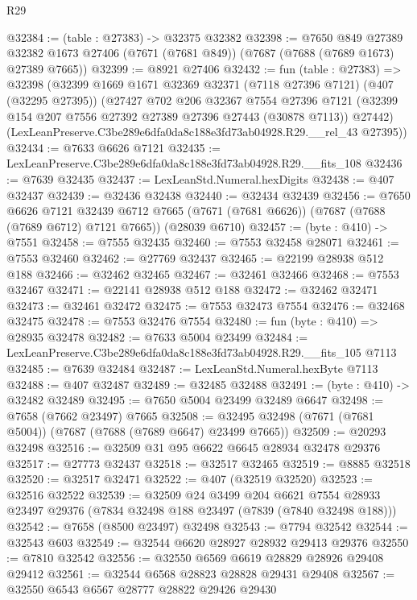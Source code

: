 \begin{lexlean}{R29}
\begin{coremodule}
@32384 := (table : @27383) -> @32375 @32382
@32398 := @7650
    @849
    @27389
    @32382
    @1673
    @27406
    (@7671 (@7681 @849))
    (@7687 (@7688 (@7689 @1673) @27389 @7665))
@32399 := @8921 @27406
@32432 := fun (table : @27383) =>
  @32398
    (@32399
      @1669
      @1671
      @32369
      @32371
      (@7118 @27396 @7121)
      (@407 (@32295 @27395))
      (@27427
        @702
        @206
        @32367
        @7554
        @27396
        @7121
        (@32399 @154 @207 @7556 @27392 @27389 @27396 @27443 (@30878 @7113))
        @27442)
      (LexLeanPreserve.C3be289e6dfa0da8c188e3fd73ab04928.R29.__rel_43 @27395))
@32434 := @7633 @6626 @7121
@32435 := LexLeanPreserve.C3be289e6dfa0da8c188e3fd73ab04928.R29.__fits_108
@32436 := @7639 @32435
@32437 := LexLeanStd.Numeral.hexDigits
@32438 := @407 @32437
@32439 := @32436 @32438
@32440 := @32434 @32439
@32456 := @7650
    @6626
    @7121
    @32439
    @6712
    @7665
    (@7671 (@7681 @6626))
    (@7687 (@7688 (@7689 @6712) @7121 @7665))
    (@28039 @6710)
@32457 := (byte : @410) -> @7551
@32458 := @7555 @32435
@32460 := @7553 @32458 @28071
@32461 := @7553 @32460
@32462 := @27769 @32437
@32465 := @22199 @28938 @512 @188
@32466 := @32462 @32465
@32467 := @32461 @32466
@32468 := @7553 @32467
@32471 := @22141 @28938 @512 @188
@32472 := @32462 @32471
@32473 := @32461 @32472
@32475 := @7553 @32473 @7554
@32476 := @32468 @32475
@32478 := @7553 @32476 @7554
@32480 := fun (byte : @410) => @28935 @32478
@32482 := @7633 @5004 @23499
@32484 := LexLeanPreserve.C3be289e6dfa0da8c188e3fd73ab04928.R29.__fits_105 @7113
@32485 := @7639 @32484
@32487 := LexLeanStd.Numeral.hexByte @7113
@32488 := @407 @32487
@32489 := @32485 @32488
@32491 := (byte : @410) -> @32482 @32489
@32495 := @7650 @5004 @23499 @32489 @6647
@32498 := @7658 (@7662 @23497) @7665
@32508 := @32495 @32498 (@7671 (@7681 @5004)) (@7687 (@7688 (@7689 @6647) @23499 @7665))
@32509 := @20293 @32498
@32516 := @32509 @31 @95 @6622 @6645 @28934 @32478 @29376
@32517 := @27773 @32437
@32518 := @32517 @32465
@32519 := @8885 @32518
@32520 := @32517 @32471
@32522 := @407 (@32519 @32520)
@32523 := @32516 @32522
@32539 := @32509
    @24
    @3499
    @204
    @6621
    @7554
    @28933
    @23497
    @29376
    (@7834 @32498 @188 @23497 (@7839 (@7840 @32498 @188)))
@32542 := @7658 (@8500 @23497) @32498
@32543 := @7794 @32542
@32544 := @32543 @603
@32549 := @32544 @6620 @28927 @28932 @29413 @29376
@32550 := @7810 @32542
@32556 := @32550 @6569 @6619 @28829 @28926 @29408 @29412
@32561 := @32544 @6568 @28823 @28828 @29431 @29408
@32567 := @32550 @6543 @6567 @28777 @28822 @29426 @29430

\end{coremodule}
\end{lexlean}
